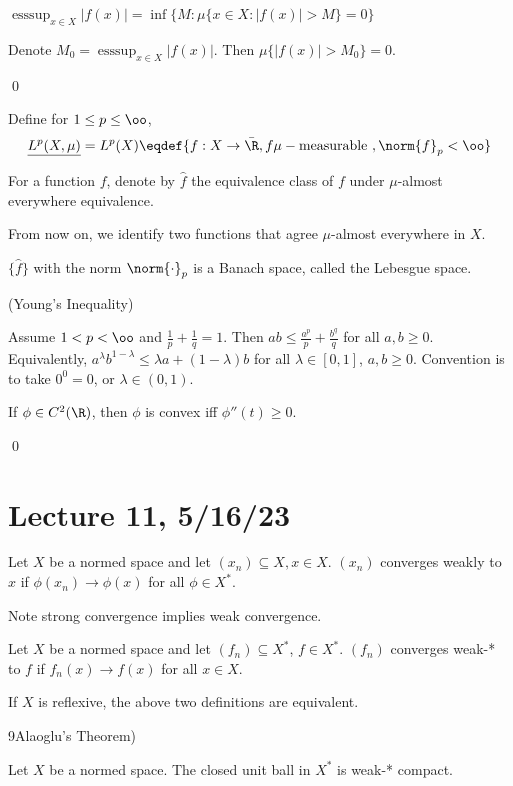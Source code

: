 \documentclass[x11names,reqno,14pt]{extarticle}
\DeclareMathOperator{\esssup}{esssup}
\begin{document}

$\operatorname{esssup}_{x\in X}|f(x)| = \inf\{M:\mu\{x\in X: |f(x)|> M\} = 0\}$

\prop Denote $M_0 = \esssup_{x\in X}|f(x)|$. Then $\mu\{|f(x)|> M_0\} = 0$. 

\proof

\qed


Define for $1 \leq p \leq \oo$, 
\[
\underline{L^p(X,\mu)} = L^p(X) \eqdef \{f:X\to\bar{\R}, f \mu-\text{measurable }, \norm{f}_p < \oo \} 
\]

For a function $f$, denote by $\hat{f}$ the equivalence class of $f$ under $\mu$-almost everywhere equivalence.

From now on, we identify two functions that agree $\mu$-almost everywhere in $X$. 

\thm $\{\hat{f}\}$ with the norm $\norm{\cdot}_p$ is a Banach space, called the Lebesgue space. 

\lem(Young's Inequality)

Assume $1 < p < \oo$ and $\frac{1}{p} + \frac{1}{q} = 1$. Then $ab \leq \frac{a^p}{p} + \frac{b^q}{q}$ for all $a, b \geq 0$. Equivalently, $a^\lambda b^{1-\lambda} \leq \lambda a + (1 - \lambda)b$ for all $\lambda \in[0, 1]$, $a, b \geq 0$. Convention is to take $0^0 = 0$, or $\lambda \in (0, 1)$. 

\thm

If $\phi \in C^2(\R)$, then $\phi$ is convex iff $\phi''(t) \geq 0$. 

\proof

\qed

\section*{Lecture 11, 5/16/23}


Let $X$ be a normed space and let $(x_n) \subseteq X, x \in X$. $(x_n)$ converges weakly to $x$ if $\phi(x_n)\to\phi(x)$ for all $\phi\in X^*$. 

Note strong convergence implies weak convergence. 


Let $X$ be a normed space and let $(f_n) \subseteq X^*$, $f \in X^*$. $(f_n)$ converges weak-* to $f$ if $f_n(x)\to f(x)$ for all $x \in X$. 

If $X$ is reflexive, the above two definitions are equivalent. 

\thm9Alaoglu's Theorem)

Let $X$ be a normed space. The closed unit ball in $X^*$ is weak-* compact. 
\end{document}
